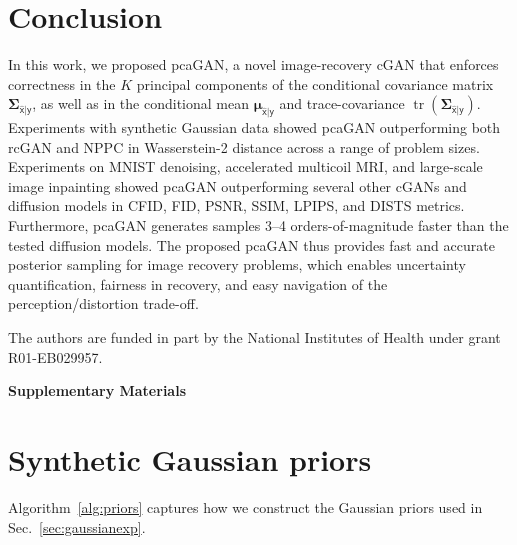 \documentclass{article}
\theoremstyle{plain}
\theoremstyle{definition}
\theoremstyle{remark}
\renewcommand{\hat}{\widehat}
\renewcommand{\vec}[1]{\ensuremath{\boldsymbol{#1}}}
\DeclareMathOperator{\tr}{tr}
\newcommand{\Algref}[1]{Algorithm~\ref{alg:#1}}
\newcommand{\secref}[1]{Sec.~\ref{sec:#1}}
\newcommand{\muxgyhat}{\vec{\mu}_{\hat{\mathsf{x}}|\mathsf{y}}}
\newcommand{\Sigxgyhat}{\vec{\Sigma}_{\hat{\mathsf{x}}|\mathsf{y}}}
\begin{document}
\section{Conclusion} \label{sec:conclusion}
In this work, we proposed pcaGAN, a novel image-recovery cGAN that enforces correctness in the $K$ principal components of the conditional covariance matrix $\Sigxgyhat$, as well as in the conditional mean $\muxgyhat$ and trace-covariance $\tr(\Sigxgyhat)$.
Experiments with synthetic Gaussian data showed pcaGAN outperforming both rcGAN \cite{Bendel:NIPS:23} and NPPC \cite{Nehme:NIPS:23} in Wasserstein-2 distance across a range of problem sizes.
Experiments on MNIST denoising, accelerated multicoil MRI, and large-scale image inpainting showed pcaGAN outperforming several other cGANs and diffusion models in CFID, FID, PSNR, SSIM, LPIPS, and DISTS metrics.
Furthermore, pcaGAN generates samples 3--4 orders-of-magnitude faster than the tested diffusion models.
The proposed pcaGAN thus provides fast and accurate posterior sampling for image recovery problems, which enables uncertainty quantification, fairness in recovery, and easy navigation of the perception/distortion trade-off.

\begin{ack}
The authors are funded in part by the National Institutes of Health under grant R01-EB029957.
\end{ack}


\small

\normalsize

\clearpage
\appendix
{}
\begin{center}
\Large \bf Supplementary Materials
\end{center}

\section{Synthetic Gaussian priors}\label{app:gaussian}
\Algref{priors} captures how we construct the Gaussian priors used in \secref{gaussianexp}.
\end{document}
